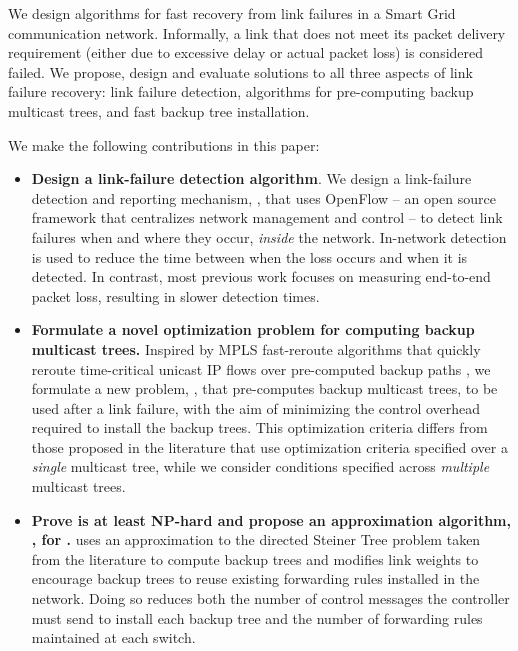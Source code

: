 We design algorithms for fast recovery from link failures in a Smart Grid communication network. 
Informally, a link that does not meet its packet delivery requirement (either due to excessive delay or actual packet loss) is considered failed. 
We propose, design and evaluate solutions to all three aspects of link failure recovery: link failure detection, algorithms for pre-computing backup multicast trees, 
and fast backup tree installation. 

We make the following contributions in this paper: 
\begin{itemize}

	\item {\bf Design a link-failure detection algorithm}. 
	We design a link-failure detection and reporting mechanism, \pcnts, that uses OpenFlow \cite{OpenFlow08} -- an open source framework 
	that centralizes network management and control -- to detect link failures when and where they occur, \emph{inside} the network.  In-network detection is used to reduce the 
	time between when the loss occurs and when it is detected. In contrast, most previous work \cite{Almes99,Caceres99,Friedl09} focuses on measuring end-to-end packet loss, 
	resulting in slower detection times. 


	\item {\bf Formulate a novel optimization problem for computing backup multicast trees.} 
	Inspired by MPLS fast-reroute algorithms that quickly reroute time-critical unicast IP flows over pre-computed backup paths \cite{Rosen01}, 
	we formulate a new problem, \mcs, that pre-computes backup multicast trees, to be used after a link failure, with the aim 
	of minimizing the control overhead required to install the backup trees. 
	 This optimization criteria differs from those proposed in the literature \cite{Cui04,Fei01,Medard99,Pointurier02,Wu97} that use optimization
 	criteria specified over a \emph{single} multicast tree, while we consider conditions specified across \emph{multiple} multicast trees. 

	\item {\bf Prove \mc is at least NP-hard and propose an approximation algorithm, \steiners, for \mcs.} 
	\steiner uses an approximation to the directed Steiner Tree problem taken from the literature \cite{Charikar98} to compute backup trees and modifies link weights to 
	encourage backup trees to reuse existing forwarding rules installed in the network. Doing so reduces both the number of control messages the controller must send to install each backup tree
	and the number of forwarding rules maintained at each switch.


\end{itemize}

